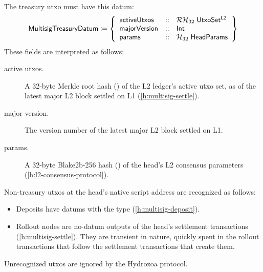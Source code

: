 \documentclass[../hydrozoa.tex]{subfiles}
\begin{document}
The treasury utxo must have this datum:
\begin{equation*}
  \mathsf{MultisigTreasuryDatum} \coloneq \left\{
    \begin{array}{lll}
      \mathsf{activeUtxos}  &::& \mathcal{RH}_{32} \; \mathsf{UtxoSet^{L2}} \\
      \mathsf{majorVersion} &::& \mathsf{Int} \\
      \mathsf{params} &::& \mathcal{H}_{32} \; \mathsf{HeadParams}
    \end{array}\right\}
\end{equation*}
These fields are interpreted as follows:
\begin{description}
  \item[active utxos.] A 32-byte Merkle root hash () of the L2 ledger's active utxo set, as of the latest major L2 block settled on L1 (\cref{h:multisig-settle}).
  \item[major version.] The version number of the latest major L2 block settled on L1.
  \item[params.] A 32-byte Blake2b-256 hash () of the head's L2 consensus parameters (\cref{h:l2-consensus-protocol}).
\end{description}

Non-treasury utxos at the head's native script address are recognized as follows:
\begin{itemize}
  \item Deposits have datums with the  type (\cref{h:multisig-deposit}).
  \item Rollout nodes are no-datum outputs of the head's settlement transactions (\cref{h:multisig-settle}).
    They are transient in nature, quickly spent in the rollout transactions that follow the settlement transactions that create them.
\end{itemize}

Unrecognized utxos are ignored by the Hydrozoa protocol.
\end{document}

